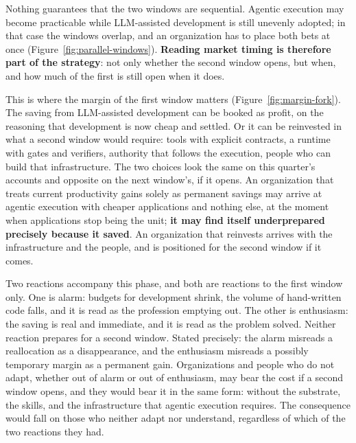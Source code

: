 \documentclass[10pt,oneside,openany]{book}
\begin{document}
Nothing guarantees that the two windows are sequential. Agentic execution may become practicable while LLM-assisted development is still unevenly adopted; in that case the windows overlap, and an organization has to place both bets at once (Figure~\ref{fig:parallel-windows}). \textbf{Reading market timing is therefore part of the strategy}: not only whether the second window opens, but when, and how much of the first is still open when it does.


This is where the margin of the first window matters (Figure~\ref{fig:margin-fork}). The saving from LLM-assisted development can be booked as profit, on the reasoning that development is now cheap and settled. Or it can be reinvested in what a second window would require: tools with explicit contracts, a runtime with gates and verifiers, authority that follows the execution, people who can build that infrastructure. The two choices look the same on this quarter's accounts and opposite on the next window's, if it opens. An organization that treats current productivity gains solely as permanent savings may arrive at agentic execution with cheaper applications and nothing else, at the moment when applications stop being the unit; \textbf{it may find itself underprepared precisely because it saved}. An organization that reinvests arrives with the infrastructure and the people, and is positioned for the second window if it comes.

Two reactions accompany this phase, and both are reactions to the first window only. One is alarm: budgets for development shrink, the volume of hand-written code falls, and it is read as the profession emptying out. The other is enthusiasm: the saving is real and immediate, and it is read as the problem solved. Neither reaction prepares for a second window. Stated precisely: the alarm misreads a reallocation as a disappearance, and the enthusiasm misreads a possibly temporary margin as a permanent gain. Organizations and people who do not adapt, whether out of alarm or out of enthusiasm, may bear the cost if a second window opens, and they would bear it in the same form: without the substrate, the skills, and the infrastructure that agentic execution requires. The consequence would fall on those who neither adapt nor understand, regardless of which of the two reactions they had.
\end{document}
